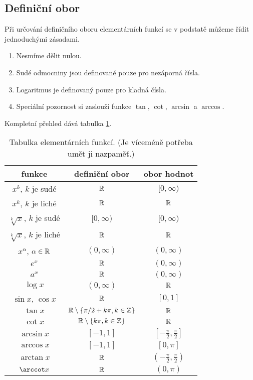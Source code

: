 \subsection{Definiční obor}

Při určování definičního oboru elementárních funkcí se v podstatě můžeme řídit jednoduchými zásadami.

\begin{enumerate}
    \item Nesmíme dělit nulou.
    \item Sudé odmocniny jsou definované pouze pro nezáporná čísla.
    \item Logaritmus je definovaný pouze pro kladná čísla.
    \item Speciální pozornost si zaslouží funkce $\tan$, $\cot$, $\arcsin$ a $\arccos$.
\end{enumerate}

Kompletní přehled dává tabulka \ref{tab:funkce}.

\begin{table}[H]
    \centering
    \begin{tabular}{|c|c|c|}
        \hline
        funkce & definiční obor & obor hodnot \\
        \hline
        $x^k$, $k$ je sudé              & $\mathbb{R}$          & $[0, \infty)$ \\ 
        $x^k$, $k$ je liché             & $\mathbb{R}$          & $\mathbb{R}$ \\ 
        $\sqrt[k]{x}$, $k$ je sudé      & $[0, \infty)$ & $[0, \infty)$ \\
        $\sqrt[k]{x}$, $k$ je liché     & $\mathbb{R}$          & $\mathbb{R}$ \\
        $x^\alpha$, $\alpha \in \mathbb{R}$     & $(0, \infty)$ & $(0, \infty)$ \\
        $e^x$                           & $\mathbb{R}$          & $(0, \infty)$ \\
        $a^x$                           & $\mathbb{R}$          & $(0, \infty)$ \\
        $\log x$                        & $(0, \infty)$ & $\mathbb{R}$ \\
        $\sin x$, $\cos x$              & $\mathbb{R}$          & $[0,1]$ \\
        $\tan x$                        & $\mathbb{R} \setminus \left \lbrace \pi/2 + k \pi, k \in \mathbb{Z} \right \rbrace$ & $\mathbb{R}$ \\
        $\cot x$                        & $\mathbb{R} \setminus \left \lbrace k \pi, k \in \mathbb{Z} \right \rbrace$  & $\mathbb{R}$ \\
        $\arcsin x$                     & $[-1,1]$      & $[-\frac{\pi}{2}, \frac{\pi}{2}]$ \\
        $\arccos x$                     & $[-1,1]$      & $[0,\pi]$ \\
        $\arctan x$                     & $\mathbb{R}$          & $(-\frac{\pi}{2}, \frac{\pi}{2})$ \\
        $\arccot x$                     & $\mathbb{R}$          & $(0,\pi)$ \\
         \hline
    \end{tabular}
    \caption{Tabulka elementárních funkcí. (Je víceméně potřeba umět ji nazpaměť.)}
    \label{tab:funkce}
\end{table}

